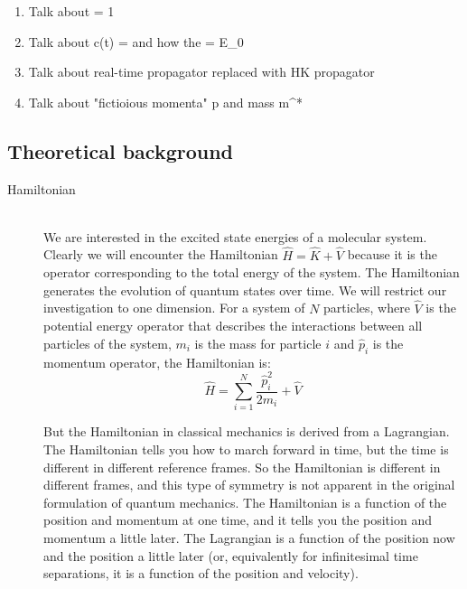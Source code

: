 \documentclass[12pt,letterpaper,oneside,final,titlepage]{article}               %
\numberwithin{equation}{section} %
\newcommand{\psiT}{\psi_{\textrm{T}}}
\begin{document}
\begin{enumerate}
	\item Talk about \braket{\psiT|q} = 1
	\item Talk about c(t) =  and how the  = E_{0}
	\item Talk about real-time propagator replaced with HK propagator
	\item Talk about "fictioious momenta" p and mass m^{*}
\end{enumerate}





\subsection{Theoretical background}
\begin{description}
    \item[Hamiltonian] \hfill \\
    We are interested in the excited state energies of a molecular system. 
    Clearly we will encounter the Hamiltonian $\hat{H} = \hat{K} + \hat{V}$ because it is the operator corresponding to the total energy of the system.
    The Hamiltonian generates the evolution of quantum states over time. 
    We will restrict our investigation to one dimension. 
    For a system of $N$ particles, where $\hat{V}$ is the potential energy operator that describes the interactions between 
    all particles of the system, $m_{i}$ is the mass for particle $i$ and $\hat{p}_{i}$ is the momentum operator, the Hamiltonian is:
    \begin{equation}
        \hat{H} = \sum_{i=1}^{N}\frac{\hat{p}_{i}^2}{2m_{i}} + \hat{V}
    \end{equation}

    But the Hamiltonian in classical mechanics is derived from a Lagrangian. 
    The Hamiltonian tells you how to march forward in time, but the time is different in different reference frames. 
    So the Hamiltonian is different in different frames, and this type of symmetry is not apparent in the original formulation of quantum mechanics.
    The Hamiltonian is a function of the position and momentum at one time, and it tells you the position and momentum a little later. 
    The Lagrangian is a function of the position now and the position a little later (or, equivalently for infinitesimal time separations, it is a function of the position and velocity). 




\end{description}
\end{document}
